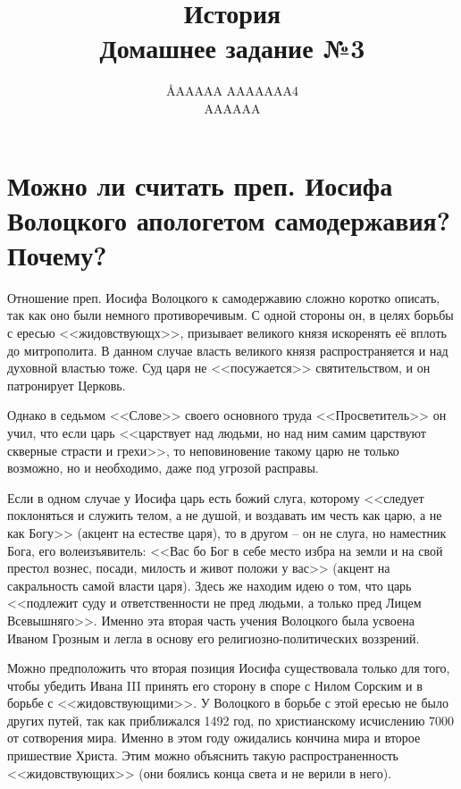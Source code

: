 \documentclass[12pt]{article}
\title{История \\ Домашнее задание №3}
\author{\AA{AAAAA AAAAAAA}{4} \\ AAAAAA}
\begin{document}
  \maketitle
  \setcounter{section}{2}

  \section{Можно ли считать преп. Иосифа Волоцкого апологетом\protect\footnotemark{} самодержавия\protect\footnotemark{}? Почему?}
  \addtocounter{footnote}{-2}

  Отношение преп. Иосифа Волоцкого к самодержавию сложно коротко описать, так как оно были немного противоречивым.
  С одной стороны он, в целях борьбы с ересью <<жидовствующх>>, призывает великого князя искоренять её вплоть до митрополита.
  В данном случае власть великого князя распространяется и над духовной властью тоже.
  Суд царя не <<посужается>> святительством, и он патронирует Церковь.

  Однако в седьмом <<Слове>> своего основного труда <<Просветитель>> он учил,
  что если царь <<царствует над людьми, но над ним самим царствуют скверные страсти и грехи>>,
  то неповиновение такому царю не только возможно, но и необходимо, даже под угрозой расправы.

  Если в одном случае у Иосифа царь есть божий слуга,
  которому <<следует поклоняться и служить телом, а не душой, и воздавать им честь как царю, а не как Богу>> (акцент на естестве царя),
  то в другом -- он не слуга, но наместник Бога, его волеизъявитель:
  <<Вас бо Бог в себе место избра на земли и на свой престол вознес, посади, милость и живот положи у вас>>
  (акцент на сакральность самой власти царя).
  Здесь же находим идею о том, что царь <<подлежит суду и ответственности не пред людьми, а только пред Лицем Всевышняго>>.
  Именно эта вторая часть учения Волоцкого была усвоена Иваном Грозным и легла в основу его религиозно-политических воззрений.

  Можно предположить что вторая позиция Иосифа существовала только для того,
  чтобы убедить Ивана III принять его сторону в споре с Нилом Сорским и в борьбе с <<жидовствующими>>.
  У Волоцкого в борьбе с этой ересью не было других путей, так как приближался 1492 год, по христианскому исчислению 7000 от сотворения мира.
  Именно в этом году ожидались кончина мира и второе пришествие Христа.
  Этим можно объяснить такую распространенность <<жидовствующих>> (они боялись конца света и не верили в него).
\end{document}
